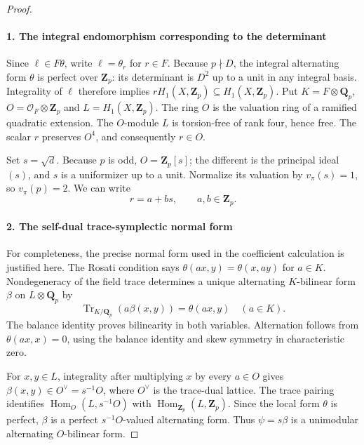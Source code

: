 \begin{proof}
\paragraph{1. The integral endomorphism corresponding to the determinant}

Since \(\ell\in F\theta\), write \(\ell=\theta_r\) for \(r\in F\). Because \(p\nmid D\), the integral alternating form \(\theta\) is perfect over \(\mathbf Z_p\): its determinant is \(D^2\) up to a unit in any integral basis. Integrality of \(\ell\) therefore implies \(rH_1(X,\mathbf Z_p)\subseteq H_1(X,\mathbf Z_p)\). Put \(K=F\otimes\mathbf Q_p\), \(O=\mathcal O_F\otimes\mathbf Z_p\) and \(L=H_1(X,\mathbf Z_p)\). The ring \(O\) is the valuation ring of a ramified quadratic extension. The \(O\)-module \(L\) is torsion-free of rank four, hence free. The scalar \(r\) preserves \(O^4\), and consequently \(r\in O\).

Set \(s=\sqrt d\). Because \(p\) is odd, \(O=\mathbf Z_p[s]\); the different is the principal ideal \((s)\), and \(s\) is a uniformizer up to a unit. Normalize its valuation by \(v_\pi(s)=1\), so \(v_\pi(p)=2\). We can write \[
 r=a+bs,\qquad a,b\in\mathbf Z_p.
 \tag{S33.5}
\]

\paragraph{2. The self-dual trace-symplectic normal form}

For completeness, the precise normal form used in the coefficient calculation is justified here. The Rosati condition says \(\theta(ax,y)=\theta(x,ay)\) for \(a\in K\). Nondegeneracy of the field trace determines a unique alternating \(K\)-bilinear form \(\beta\) on \(L\otimes\mathbf Q_p\) by \[
 \operatorname{Tr}_{K/\mathbf Q_p}(a\beta(x,y))=\theta(ax,y)
 \quad(a\in K).
\] The balance identity proves bilinearity in both variables. Alternation follows from \(\theta(ax,x)=0\), using the balance identity and skew symmetry in characteristic zero.

For \(x,y\in L\), integrality after multiplying \(x\) by every \(a\in O\) gives \(\beta(x,y)\in O^\vee=s^{-1}O\), where \(O^\vee\) is the trace-dual lattice. The trace pairing identifies \(\operatorname{Hom}_O(L,s^{-1}O)\) with \(\operatorname{Hom}_{\mathbf Z_p}(L,\mathbf Z_p)\). Since the local form \(\theta\) is perfect, \(\beta\) is a perfect \(s^{-1}O\)-valued alternating form. Thus \(\psi=s\beta\) is a unimodular alternating \(O\)-bilinear form.


\end{proof}
